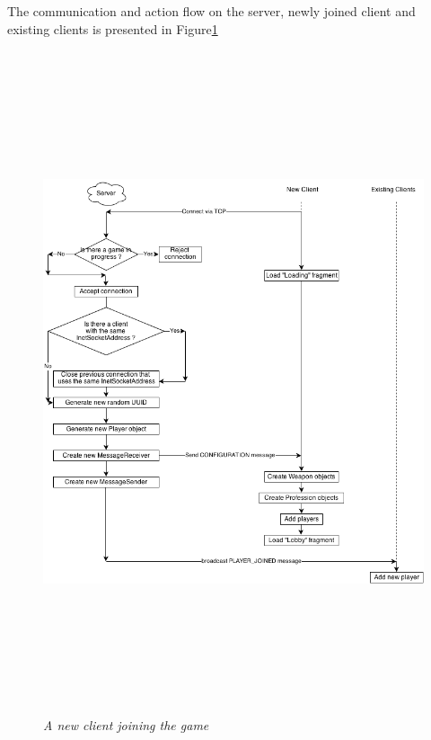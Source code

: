 The communication and action flow on the server, newly joined client and
existing clients is presented in Figure\ref{fig:client_server_flow}

\begin{figure}
\includegraphics[height=7.665in,width=6.23in]{./images/diagrams/Client-Server.png}
\caption{\small \sl A new client joining the game
\label{fig:client_server_flow}}
\end{figure}
